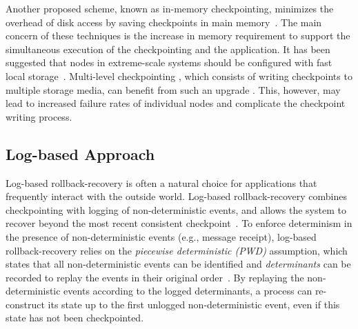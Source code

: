 Another proposed scheme, known as in-memory checkpointing, minimizes the overhead of disk access by saving checkpoints in main memory~\cite{zheng_2004_ftccharm,6264677}.
The main concern of these techniques is the increase in
memory requirement to support the simultaneous execution of the checkpointing and the application. 
It has been suggested that nodes in extreme-scale systems should be configured with fast local storage~\cite{doe_ascr_exascale_2011}. 
Multi-level checkpointing , which consists of
writing checkpoints to multiple storage media, 
can benefit from such an upgrade \cite{Moody:10:SCR}. This,
however, may lead to increased failure rates of individual nodes and complicate the checkpoint writing process.




\subsection{Log-based Approach}
Log-based rollback-recovery is often a
natural choice for applications that frequently
interact with the outside world. 
Log-based rollback-recovery combines checkpointing with logging of non-deterministic events, and allows the system to recover beyond the most recent consistent checkpoint~\cite{strom1985optimistic}.
To enforce determinism in the presence of non-deterministic events (e.g., message receipt), log-based rollback-recovery relies on the \textit{piecewise deterministic (PWD)} assumption, which states that all non-deterministic events can be identified and \textit{determinants} can be recorded to replay the events in their original order~\cite{alvisi1996trade}. By replaying the non-deterministic
events according to the logged determinants, a
process can re-construct its
state up to the first unlogged non-deterministic event, even if this state has not been checkpointed.

